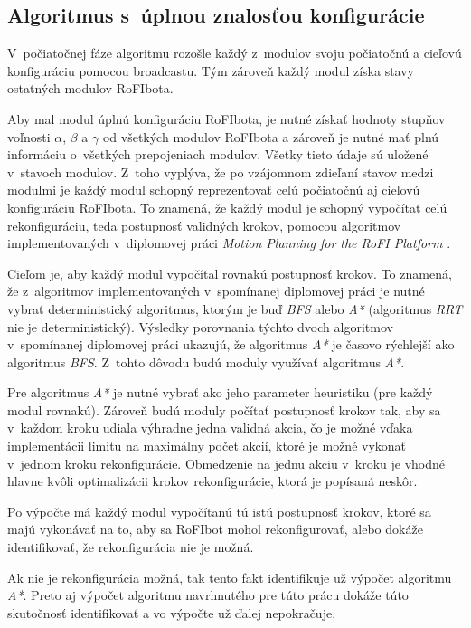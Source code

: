 \documentclass[
  printed, %
  oneside, %
  notable,   %
  nolof,     %
  nolot,     %
]{fithesis3}
\begin{document}
\subsection{Algoritmus s~úplnou znalosťou konfigurácie}
\label{sec:motionPlanningAlgo}
V~počiatočnej fáze algoritmu rozošle každý z~modulov svoju počiatočnú a cieľovú konfiguráciu pomocou broadcastu. Tým zároveň každý modul získa stavy ostatných modulov RoFIbota. 

Aby mal modul úplnú konfiguráciu RoFIbota, je nutné získať hodnoty stupňov voľnosti $\alpha$, $\beta$ a $\gamma$ od všetkých modulov RoFIbota a zároveň je nutné mať plnú informáciu o~všetkých prepojeniach modulov. Všetky tieto údaje sú uložené v~stavoch modulov. Z~toho vyplýva, že po vzájomnom zdieľaní stavov medzi modulmi je každý modul schopný reprezentovať celú počiatočnú aj cieľovú konfiguráciu RoFIbota. To znamená, že každý modul je schopný vypočítať celú rekonfiguráciu, teda postupnosť validných krokov, pomocou algoritmov implementovaných v~diplomovej práci \textit{Motion Planning for the RoFI Platform} \cite{vozarovaMasterThesis}. 

Cieľom je, aby každý modul vypočítal rovnakú postupnosť krokov. To znamená, že z~algoritmov implementovaných v~spomínanej diplomovej práci je nutné vybrať deterministický algoritmus, ktorým je buď \textit{BFS} alebo \textit{A*} (algoritmus \textit{RRT} nie je deterministický). Výsledky porovnania týchto dvoch algoritmov v~spomínanej diplomovej práci ukazujú, že algoritmus \textit{A*} je časovo rýchlejší ako algoritmus \textit{BFS}. Z~tohto dôvodu budú moduly využívať algoritmus \textit{A*}. 

Pre algoritmus \textit{A*} je nutné vybrať ako jeho parameter heuristiku (pre každý modul rovnakú). Zároveň budú moduly počítať postupnosť krokov tak, aby sa v~každom kroku udiala výhradne jedna validná akcia, čo je možné vďaka implementácii limitu na maximálny počet akcií, ktoré je možné vykonať v~jednom kroku rekonfigurácie. Obmedzenie na jednu akciu v~kroku je vhodné hlavne kvôli optimalizácii krokov rekonfigurácie, ktorá je popísaná neskôr. 

Po výpočte má každý modul vypočítanú tú istú postupnosť krokov, ktoré sa majú vykonávať na to, aby sa RoFIbot mohol rekonfigurovať, alebo dokáže identifikovať, že rekonfigurácia nie je možná. 

Ak nie je rekonfigurácia možná, tak tento fakt identifikuje už výpočet algoritmu \textit{A*}. Preto aj výpočet algoritmu navrhnutého pre túto prácu dokáže túto skutočnosť identifikovať a vo výpočte už ďalej nepokračuje. 
\end{document}
